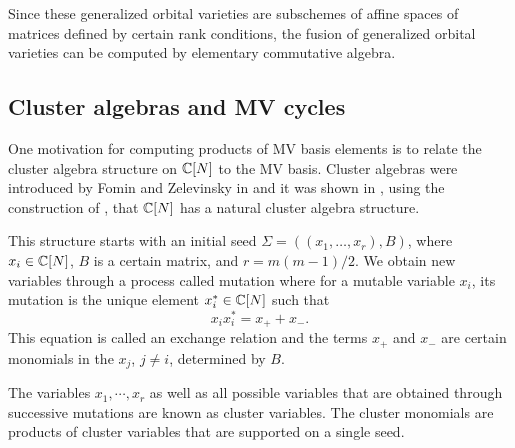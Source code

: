 \documentclass[draft]{article} %
\begin{document}
Since these generalized orbital varieties are subschemes of affine spaces of matrices defined by certain rank conditions, the fusion of generalized orbital varieties can be computed by elementary commutative algebra.

\subsection{Cluster algebras and MV cycles}
One motivation for computing products of MV basis elements is to relate the cluster algebra structure on $\mathbb C[N]$ to the MV basis. Cluster algebras were introduced by Fomin and Zelevinsky in \cite{fomin2002cluster1} and it was shown in \cite{geiss2007initial}, using the construction of \cite{berenstein2005cluster3}, that $\mathbb C[N]$ has a natural cluster algebra structure. 

This structure starts with an initial seed $\Sigma = ((x_1,\dots,x_r),B)$, where $x_i \in \mathbb C[N]$, $B$ is a certain matrix, and $ r = m(m-1)/2$.
We obtain new variables through a process called mutation where for a mutable variable $x_i$, its mutation is the unique element $x_i^* \in \mathbb C[N]$ such that $$x_ix_i^* = x_+ + x_-.$$
This equation is called an exchange relation and the terms $x_+$ and $x_-$ are certain monomials in the $x_j$, $j\neq i$,  determined by $B$. 

The variables $x_1,\cdots,x_r$ as well as all possible variables that are obtained through successive mutations are known as cluster variables. The cluster monomials are products of cluster variables that are supported on a single seed.
\end{document}
